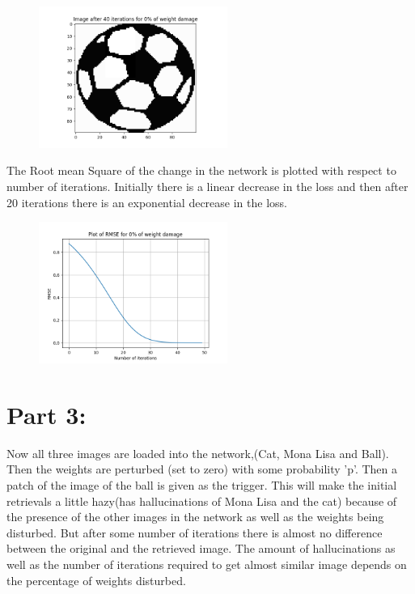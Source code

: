 \documentclass{article}
\begin{document}
\begin{figure}[H]
\includegraphics[width=0.55\textwidth]{Figure_14.png}
\centering
\end{figure}


The Root mean Square of the change in the network is plotted with respect to number of iterations. Initially there is a linear decrease in the loss and then after 20 iterations there is an exponential decrease in the loss.
\begin{figure}[H]
\includegraphics[width=0.55\textwidth]{Figure_15.png}
\centering
\end{figure}

\section{Part 3:}
Now all three images are loaded into the network,(Cat, Mona Lisa and Ball). Then the weights are perturbed (set to zero) with some probability 'p'. Then a patch of the image of the ball is given as the trigger. This will make the initial retrievals a little hazy(has hallucinations of Mona Lisa and the cat) because of the presence of the other images in the network as well as the weights being disturbed. But after some number of iterations there is almost no difference between the original and the retrieved image. The amount of hallucinations as well as the number of iterations required to get almost similar image depends on the percentage of weights disturbed.
\end{document}
